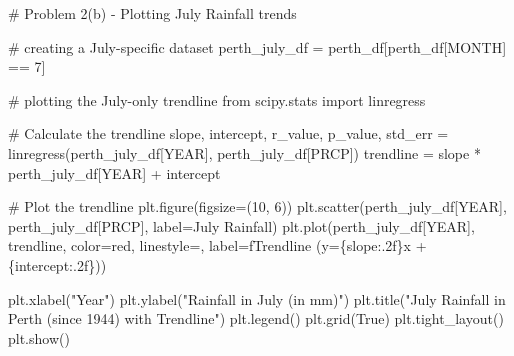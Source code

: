 \documentclass[
  letterpaper,
  DIV=11,
  numbers=noendperiod]{scrartcl}
\newenvironment{Shaded}{\begin{snugshade}}{\end{snugshade}}
\newcommand{\CommentTok}[1]{\textcolor[rgb]{0.37,0.37,0.37}{#1}}
\newcommand{\DecValTok}[1]{\textcolor[rgb]{0.68,0.00,0.00}{#1}}
\newcommand{\ImportTok}[1]{\textcolor[rgb]{0.00,0.46,0.62}{#1}}
\newcommand{\NormalTok}[1]{\textcolor[rgb]{0.00,0.23,0.31}{#1}}
\newcommand{\OperatorTok}[1]{\textcolor[rgb]{0.37,0.37,0.37}{#1}}
\newcommand{\SpecialCharTok}[1]{\textcolor[rgb]{0.37,0.37,0.37}{#1}}
\newcommand{\SpecialStringTok}[1]{\textcolor[rgb]{0.13,0.47,0.30}{#1}}
\newcommand{\StringTok}[1]{\textcolor[rgb]{0.13,0.47,0.30}{#1}}
\newcommand{\VariableTok}[1]{\textcolor[rgb]{0.07,0.07,0.07}{#1}}
\begin{document}
\begin{Shaded}
\begin{Highlighting}[]
\CommentTok{\# Problem 2(b) {-} Plotting July Rainfall trends}

\CommentTok{\# creating a July{-}specific dataset}
\NormalTok{perth\_july\_df }\OperatorTok{=}\NormalTok{ perth\_df[perth\_df[}\StringTok{\textquotesingle{}MONTH\textquotesingle{}}\NormalTok{] }\OperatorTok{==} \DecValTok{7}\NormalTok{]}

\CommentTok{\# plotting the July{-}only trendline}
\ImportTok{from}\NormalTok{ scipy.stats }\ImportTok{import}\NormalTok{ linregress}

\CommentTok{\# Calculate the trendline}
\NormalTok{slope, intercept, r\_value, p\_value, std\_err }\OperatorTok{=}\NormalTok{ linregress(perth\_july\_df[}\StringTok{\textquotesingle{}YEAR\textquotesingle{}}\NormalTok{], perth\_july\_df[}\StringTok{\textquotesingle{}PRCP\textquotesingle{}}\NormalTok{])}
\NormalTok{trendline }\OperatorTok{=}\NormalTok{ slope }\OperatorTok{*}\NormalTok{ perth\_july\_df[}\StringTok{\textquotesingle{}YEAR\textquotesingle{}}\NormalTok{] }\OperatorTok{+}\NormalTok{ intercept}

\CommentTok{\# Plot the trendline}
\NormalTok{plt.figure(figsize}\OperatorTok{=}\NormalTok{(}\DecValTok{10}\NormalTok{, }\DecValTok{6}\NormalTok{))}
\NormalTok{plt.scatter(perth\_july\_df[}\StringTok{\textquotesingle{}YEAR\textquotesingle{}}\NormalTok{], perth\_july\_df[}\StringTok{\textquotesingle{}PRCP\textquotesingle{}}\NormalTok{], label}\OperatorTok{=}\StringTok{\textquotesingle{}July Rainfall\textquotesingle{}}\NormalTok{)}
\NormalTok{plt.plot(perth\_july\_df[}\StringTok{\textquotesingle{}YEAR\textquotesingle{}}\NormalTok{], trendline, color}\OperatorTok{=}\StringTok{\textquotesingle{}red\textquotesingle{}}\NormalTok{, linestyle}\OperatorTok{=}\StringTok{\textquotesingle{}{-}{-}\textquotesingle{}}\NormalTok{, label}\OperatorTok{=}\SpecialStringTok{f\textquotesingle{}Trendline (y=}\SpecialCharTok{\{}\NormalTok{slope}\SpecialCharTok{:.2f\}}\SpecialStringTok{x + }\SpecialCharTok{\{}\NormalTok{intercept}\SpecialCharTok{:.2f\}}\SpecialStringTok{)\textquotesingle{}}\NormalTok{)}

\NormalTok{plt.xlabel(}\StringTok{"Year"}\NormalTok{)}
\NormalTok{plt.ylabel(}\StringTok{"Rainfall in July (in mm)"}\NormalTok{)}
\NormalTok{plt.title(}\StringTok{"July Rainfall in Perth (since 1944) with Trendline"}\NormalTok{)}
\NormalTok{plt.legend()}
\NormalTok{plt.grid(}\VariableTok{True}\NormalTok{)}
\NormalTok{plt.tight\_layout()}
\NormalTok{plt.show()}
\end{Highlighting}
\end{Shaded}
\end{document}
